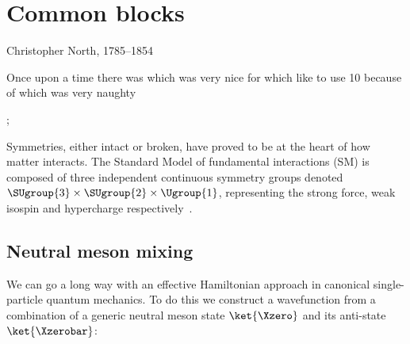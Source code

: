 \chapter{Common blocks}
\label{chap:common}


%
{Christopher North, 1785--1854}%

Once upon a time there was \chips which was very nice for \nova which like to use \unit{10}{\GeV} because
of \minos which was very naughty

;

Symmetries, either intact or broken, have proved to be at the heart
of how matter interacts. The Standard Model of fundamental interactions
(SM) is composed of three independent continuous symmetry groups denoted
$\SUgroup{3} \times \SUgroup{2} \times \Ugroup{1}$, representing the
strong force, weak isospin and hypercharge
respectively~\cite{Phys.Rev.Lett.19.1264, Phys.Rev.D2.1285,hep-ph/0410370}.

\section{Neutral meson mixing}
\label{sec:neutralmixing}
We can go a long way with an effective Hamiltonian approach in
canonical single-particle quantum mechanics. To do this we construct
a wavefunction from a combination of a generic neutral meson state
$\ket{\Xzero}$ and its anti-state $\ket{\Xzerobar}$:

